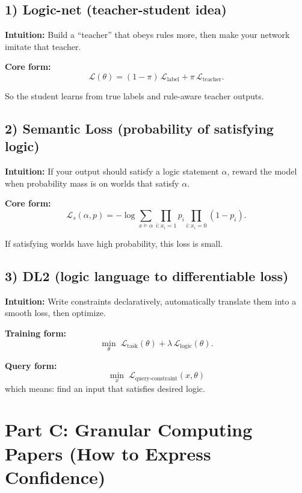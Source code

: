 ﻿\documentclass[11pt,a4paper]{article}
\begin{document}
\subsection{1) Logic-net (teacher-student idea)}
\textbf{Intuition:} Build a ``teacher'' that obeys rules more, then make your network imitate that teacher.

\textbf{Core form:}
\begin{equation}
\mathcal{L}(\theta)= (1-\pi)\,\mathcal{L}_{\text{label}} + \pi\,\mathcal{L}_{\text{teacher}}.
\end{equation}

So the student learns from true labels and rule-aware teacher outputs.

\subsection{2) Semantic Loss (probability of satisfying logic)}
\textbf{Intuition:} If your output should satisfy a logic statement $\alpha$, reward the model when probability mass is on worlds that satisfy $\alpha$.

\textbf{Core form:}
\begin{equation}
\mathcal{L}_{s}(\alpha,p)
= -\log \sum_{x \models \alpha}
\prod_{i: x_i=1} p_i \prod_{i: x_i=0}(1-p_i).
\end{equation}

If satisfying worlds have high probability, this loss is small.

\subsection{3) DL2 (logic language to differentiable loss)}
\textbf{Intuition:} Write constraints declaratively, automatically translate them into a smooth loss, then optimize.

\textbf{Training form:}
\begin{equation}
\min_{\theta}\;\mathcal{L}_{\text{task}}(\theta)+\lambda\,\mathcal{L}_{\text{logic}}(\theta).
\end{equation}

\textbf{Query form:}
\begin{equation}
\min_{x}\;\mathcal{L}_{\text{query-constraint}}(x,\theta)
\end{equation}
which means: find an input that satisfies desired logic.

\section{Part C: Granular Computing Papers (How to Express Confidence)}
\end{document}
